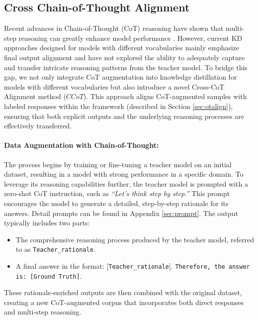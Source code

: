 \subsection{Cross Chain-of-Thought Alignment}\label{sec:ccot}

Recent advances in Chain-of-Thought (CoT) reasoning have shown that multi-step reasoning can greatly enhance model performance \citep{wei2022chain, huang2023towards, feng2024towards}. However, current KD approaches \citep{zhang2024dual, wan2024knowledge, boizard2024towards} designed for models with different vocabularies mainly emphasize final output alignment and have not explored the ability to adequately capture and transfer intricate reasoning patterns from the teacher model. To bridge this gap, we not only integrate CoT augmentation into knowledge distillation for models with different vocabularies but also introduce a novel Cross-CoT Alignment method ($CCoT$). This approach aligns CoT-augmented samples with labeled responses within the \method framework (described in Section \ref{sec:otalign}), ensuring that both explicit outputs and the underlying reasoning processes are effectively transferred.




\paragraph{Data Augmentation with Chain-of-Thought:}  
The process begins by training or fine-tuning a teacher model on an initial dataset, resulting in a model with strong performance in a specific domain. To leverage its reasoning capabilities further, the teacher model is prompted with a zero-shot CoT instruction, such as \textit{“Let’s think step by step.”} This prompt encourages the model to generate a detailed, step-by-step rationale for its answers. 
Detail prompts can be found in Appendix \ref{sec:prompt}. The output typically includes two parts:  
\begin{itemize}
    \item The comprehensive reasoning process produced by the teacher model, referred to as \texttt{Teacher\_rationale}.
    \item A final answer in the format: [\texttt{Teacher\_rationale}]. \texttt{Therefore, the answer is: [Ground Truth]}.
\end{itemize}

These rationale-enriched outputs are then combined with the original dataset, creating a new CoT-augmented corpus that incorporates both direct responses and multi-step reasoning.





